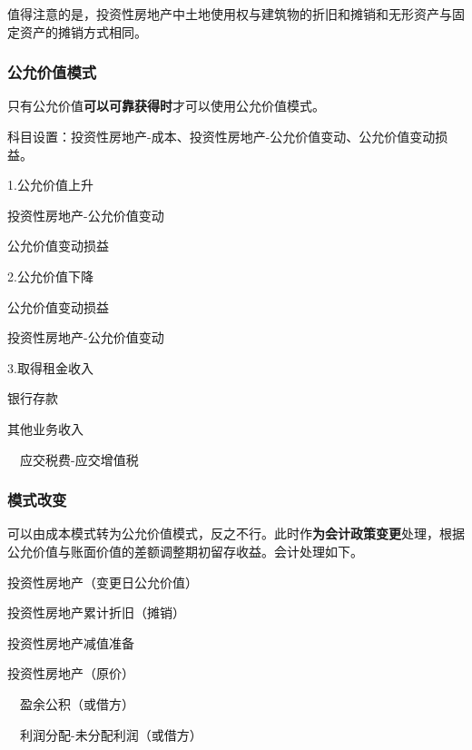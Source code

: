 \documentclass[UTF8,12pt]{ctexart}
\newenvironment{Dr}{%
	\begin{list}{}%
		{
			\setlength{\leftmargin}{2em}
			\setlength{\labelwidth}{2em}
			\setlength{\labelsep}{0pt}
			\setlength{\itemindent}{0pt}
			\setlength{\listparindent}{0pt}
			\setlength{\parsep}{0pt}
			\setlength{\topsep}{0pt}
		}
		\item[\textbf{借：}]
	}{%
	\end{list}
}
\newenvironment{Cr}{%
	\begin{list}{}%
		{
			\setlength{\leftmargin}{2em}
			\setlength{\labelwidth}{2em}
			\setlength{\labelsep}{0pt}
			\setlength{\itemindent}{0pt}
			\setlength{\listparindent}{0pt}
			\setlength{\parsep}{0pt}
			\setlength{\topsep}{0pt}
		}
		\item[\textbf{贷：}]
	}{%
	\end{list}
}
\numberwithin{equation}{section} %
\numberwithin{figure}{section}
\numberwithin{table}{section}
\begin{document}
	值得注意的是，投资性房地产中土地使用权与建筑物的折旧和摊销和无形资产与固定资产的摊销方式相同。
	
	\subsubsection{公允价值模式}
	只有公允价值\textbf{可以可靠获得时}才可以使用公允价值模式。
	
	科目设置：投资性房地产-成本、投资性房地产-公允价值变动、公允价值变动损益。
	
	1.公允价值上升
	
	\begin{Dr}
		投资性房地产-公允价值变动
	\end{Dr}
	\begin{Cr}
		公允价值变动损益
	\end{Cr}

	
	2.公允价值下降
	
	\begin{Dr}
		公允价值变动损益
	\end{Dr}
	\begin{Cr}
		投资性房地产-公允价值变动
	\end{Cr}

	
	3.取得租金收入
	
	\begin{Dr}
		银行存款
	\end{Dr}
	\begin{Cr}
		其他业务收入
		
		\ \ 应交税费-应交增值税
	\end{Cr}
	
	\subsubsection{模式改变}
	可以由成本模式转为公允价值模式，反之不行。此时作\textbf{为会计政策变更}处理，根据公允价值与账面价值的差额调整期初留存收益。会计处理如下。
	
	\begin{Dr}
		投资性房地产（变更日公允价值）
		
		投资性房地产累计折旧（摊销）
		
		投资性房地产减值准备
	\end{Dr}
	\begin{Cr}
		投资性房地产（原价）
		
		\ \ 盈余公积（或借方）
		
		\ \ 利润分配-未分配利润（或借方）
	\end{Cr}
\end{document}
